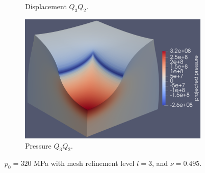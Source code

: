 \documentclass{beamer}
\begin{document}
\begin{frame}
\begin{figure}[H]
\begin{subfigure}{.5\textwidth}
			\caption{Displacement $Q_3Q_2$.}
		\end{subfigure}%
		\begin{subfigure}{.5\textwidth}
			\centering
			\includegraphics[width=.68\textwidth]{../figs/p-Q3Q2-320MPa-0.495.png}
			\caption{Pressure $Q_3Q_2$.}
		\end{subfigure}
		\caption*{$p_0=320$ MPa with mesh refinement level $l=3$, and \alert{$\nu = 0.495$}.}
	\end{figure}

\end{frame}
\end{document}
